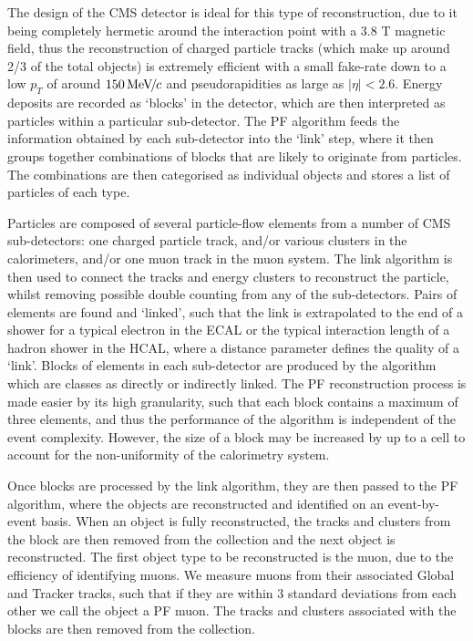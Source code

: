 The design of the CMS detector is ideal for this type of reconstruction, due to it being completely hermetic around the interaction point with a 3.8 T magnetic field, thus the reconstruction of charged particle tracks (which make up around 2/3 of the total objects) is extremely efficient with a small fake-rate down to a low $p_T$ of around $150 {\,\text{Me\hspace{-.08em}V\hspace{-0.16em}/\hspace{-0.08em}}c}$ and pseudorapidities as large as $|\eta| < 2.6$. Energy deposits are recorded as `blocks' in the detector, which are then interpreted as particles within a particular sub-detector. The PF algorithm feeds the information obtained by each sub-detector into the `link' step, where it then groups together combinations of blocks that are likely to originate from particles. The combinations are then categorised as individual objects and stores a list of particles of each type. 

Particles are composed of several particle-flow elements from a number of CMS sub-detectors: one charged particle track, and/or various clusters in the calorimeters, and/or one muon track in the muon system. The link algorithm is then used to connect the tracks and energy clusters to reconstruct the particle, whilst removing possible double counting from any of the sub-detectors. Pairs of elements are found and `linked', such that the link is extrapolated to the end of a shower for a typical electron in the ECAL or the typical interaction length
of a hadron shower in the HCAL, where a distance parameter defines the quality of a `link'. Blocks of elements in each sub-detector are produced by the algorithm which are classes as directly or indirectly linked. The PF reconstruction process is made easier by its high granularity, such that each block contains a maximum of three elements, and thus the performance of the algorithm is independent of the event complexity. However, the size of a block may be increased by up to a cell to account for the non-uniformity of the calorimetry system. 

Once blocks are processed by the link algorithm, they are then passed to the PF algorithm, where the objects are reconstructed and identified on an event-by-event basis. When an object is fully reconstructed, the tracks and clusters from the block are then removed from the collection and the next object is reconstructed. The first object type to be reconstructed is the muon, due to the efficiency of identifying muons. We measure muons from their associated Global and Tracker tracks, such that if they are within 3 standard deviations from each other we call the object a PF muon. The tracks and clusters associated with the blocks are then removed from the collection. 

